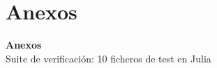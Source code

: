 \documentclass{beamer}
\newif\ifanexos
\begin{document}
\appendix
\anexostrue
\setcounter{framenumber}{0}
\section{Anexos}

\begin{frame}
  \begin{center}
    {\Large\textbf{Anexos}}\\[0.6cm]
    {\normalsize Suite de verificación: 10 ficheros de test en Julia}
  \end{center}
\end{frame}
\end{document}
